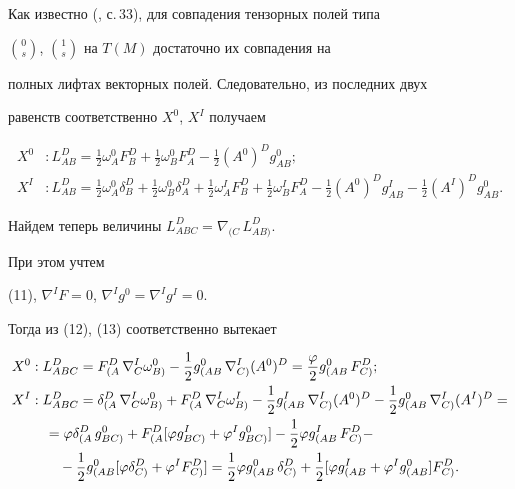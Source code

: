 Как известно (\cite{5}, с.\,33), для совпадения тензорных полей типа


$\binom{0}{s}$, $\binom{1}{s}$ на $T(M)$ достаточно их совпадения на


полных лифтах векторных полей. Следовательно, из последних двух


равенств соответственно $X^0$, $X^I$ получаем


\begin{align}


X^0&: L^D_{AB}=\frac{1}{2}\omega^0_A F^D_B+\frac{1}{2}


\omega^0_B F^D_A-\frac{1}{2}(A^0)^D g^0_{AB}; \\


X^I&: L^D_{AB}=\frac{1}{2}\omega^0_A\delta^D_B+\frac{1}{2}


\omega^0_B\delta^D_A+\frac{1}{2}\omega^I_A F^D_B+\frac{1}{2}


\omega^I_B F^D_A-\frac{1}{2}(A^0)^D g^I_{AB}-\frac{1}{2}


(A^I)^D g^0_{AB}.


\end{align}


Найдем теперь величины $L^D_{ABC}=\nabla_{(C}\,L^D_{AB)}$.


При этом учтем


(11), $\nabla^I F=0$, $\nabla^I g^0=\nabla^I g^I=0$.


Тогда из (12), (13) соответственно вытекает


\begin{align}


X^0&: L^D_{ABC}=F^D_{(A}\,\nabla^I_C\omega^0_{B)}-\frac{1}{2}


g^0_{(AB}\,\nabla^I_{C)}(A^0)^D=\frac{\varphi}{2}


g^0_{(AB}\,F^D_{C)}; \\


%


X^I&: L^D_{ABC}=\delta^D_{(A}\,\nabla^I_C\omega^0_{B)}


+F^D_{(A}\,\nabla^I_C\omega^I_{B)}-\frac{1}{2}g^I_{(AB}\,


\nabla^I_{C)}(A^0)^D-\frac{1}{2}g^0_{(AB}\,\nabla^I_{C)}


(A^I)^D= \notag \\


%


&\quad =\varphi\delta^D_{(A}\,g^0_{BC)}+F^D_{(A}


[\varphi g^I_{BC)}+\varphi^I g^0_{BC)}]-\frac{1}{2}


\varphi g^I_{(AB}\,F^D_{C)}- \notag \\


&\qquad -\frac{1}{2}g^0_{(AB}[\varphi\delta^D_{C)}+


\varphi^I F^D_{C)}]=\frac{1}{2}\varphi g^0_{(AB}\,\delta^D_{C)}


+\frac{1}{2}[\varphi g^I_{(AB}+\varphi^I g^0_{(AB}]F^D_{C)}.


\end{align}


